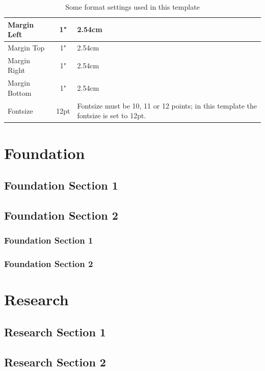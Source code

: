 \begin{center}
\begin{table}[h]
\caption[Format settings]{Some format settings used in this template}
	\begin{tabular}{| l | c | p{8cm} |}
		\hline
		Margin Left & 1" & 2.54cm \\[5pt] \hline
		Margin Top & 1" & 2.54cm \\ \hline
		Margin Right & 1" & 2.54cm \\ \hline
		Margin Bottom & 1" & 2.54cm \\ \hline
		Fontsize & 12pt & Fontsize must be 10, 11 or 12 points; in this template the fontsize is set to 12pt.  \\ \hline
	
	\end{tabular}
	
\end{table}
\end{center}
		
\chapter{Foundation}
\lipsum[1]
	\section{Foundation Section 1}
	\lipsum[1-3]
	\section{Foundation Section 2}
	\lipsum[1-3]
	\subsection*{Foundation Section 1}
	\lipsum[1-3]
	\subsection*{Foundation Section 2}
	\lipsum[1-3]

\chapter{Research}
\lipsum[1]
	\section{Research Section 1}
	\lipsum[1-3]
	\section{Research Section 2}
	\lipsum[1-3]
